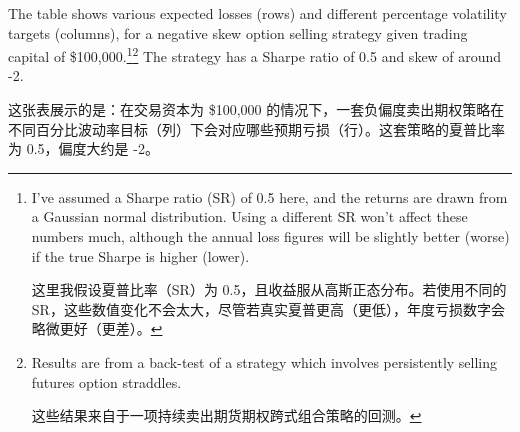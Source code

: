 \begin{englishblock} The table shows various expected losses (rows) and different percentage volatility targets (columns), for a negative skew option selling strategy given trading capital of \$100,000.\footnote{I've assumed a Sharpe ratio (SR) of 0.5 here, and the returns are drawn from a Gaussian normal distribution. Using a different SR won't affect these numbers much, although the annual loss figures will be slightly better (worse) if the true Sharpe is higher (lower). \par 这里我假设夏普比率（SR）为 0.5，且收益服从高斯正态分布。若使用不同的 SR，这些数值变化不会太大，尽管若真实夏普更高（更低），年度亏损数字会略微更好（更差）。}\footnote{Results are from a back-test of a strategy which involves persistently selling futures option straddles. \par 这些结果来自于一项持续卖出期货期权跨式组合策略的回测。} The strategy has a Sharpe ratio of 0.5 and skew of around -2. \end{englishblock}

\begin{chineseblock}这张表展示的是：在交易资本为 \$100,000 的情况下，一套负偏度卖出期权策略在不同百分比波动率目标（列）下会对应哪些预期亏损（行）。这套策略的夏普比率为 0.5，偏度大约是 -2。 \end{chineseblock}

